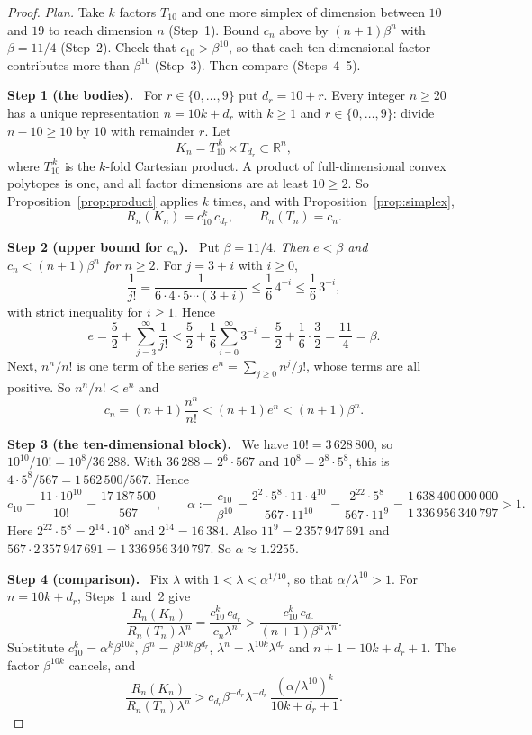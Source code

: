 \documentclass[11pt]{article}
\newcommand{\R}{\mathbb R}
\newcommand{\step}[1]{\par\smallskip\noindent\textbf{#1}\ }
\begin{document}
\begin{proof}
\emph{Plan.} Take \(k\) factors \(T_{10}\) and one more simplex of
dimension between \(10\) and \(19\) to reach dimension \(n\) (Step~1).
Bound \(c_n\) above by \((n+1)\beta^n\) with \(\beta=11/4\) (Step~2). Check
that \(c_{10}>\beta^{10}\), so that each ten-dimensional factor
contributes more than \(\beta^{10}\) (Step~3). Then compare (Steps~4--5).

\step{Step 1 (the bodies).} For \(r\in\{0,\ldots,9\}\) put \(d_r=10+r\).
Every integer \(n\ge20\) has a unique representation \(n=10k+d_r\) with
\(k\ge1\) and \(r\in\{0,\dots,9\}\): divide \(n-10\ge10\) by \(10\) with
remainder \(r\). Let
\[
 K_n=T_{10}^{\,k}\times T_{d_r}\subset\R^n,
\]
where \(T_{10}^{\,k}\) is the \(k\)-fold Cartesian product. A product of
full-dimensional convex polytopes is one, and all factor dimensions are at
least \(10\ge2\). So Proposition~\ref{prop:product} applies \(k\) times,
and with Proposition~\ref{prop:simplex},
\[
 R_n(K_n)=c_{10}^k\,c_{d_r},\qquad R_n(T_n)=c_n.
\]

\step{Step 2 (upper bound for \(c_n\)).} Put \(\beta=11/4\). \emph{Then
\(e<\beta\) and \(c_n<(n+1)\beta^n\) for \(n\ge2\).} For \(j=3+i\) with
\(i\ge0\),
\[
 \frac1{j!}=\frac1{6\cdot4\cdot5\cdots(3+i)}\le\frac16\,4^{-i}
 \le\frac16\,3^{-i},
\]
with strict inequality for \(i\ge1\). Hence
\[
 e=\frac52+\sum_{j=3}^{\infty}\frac1{j!}
 <\frac52+\frac16\sum_{i=0}^{\infty}3^{-i}
 =\frac52+\frac16\cdot\frac32=\frac{11}4=\beta.
\]
Next, \(n^n/n!\) is one term of the series
\(e^n=\sum_{j\ge0}n^j/j!\), whose terms are all positive. So
\(n^n/n!<e^n\) and
\[
 c_n=(n+1)\frac{n^n}{n!}<(n+1)e^n<(n+1)\beta^n.
\]

\step{Step 3 (the ten-dimensional block).} We have \(10!=3\,628\,800\), so
\(10^{10}/10!=10^8/36\,288\). With \(36\,288=2^6\cdot567\) and
\(10^8=2^8\cdot5^8\), this is \(4\cdot5^8/567=1\,562\,500/567\). Hence
\[
 c_{10}=\frac{11\cdot10^{10}}{10!}=\frac{17\,187\,500}{567},
 \qquad
 \alpha:=\frac{c_{10}}{\beta^{10}}
 =\frac{2^2\cdot5^8\cdot11\cdot4^{10}}{567\cdot11^{10}}
 =\frac{2^{22}\cdot5^8}{567\cdot11^9}
 =\frac{1\,638\,400\,000\,000}{1\,336\,956\,340\,797}>1.
\]
Here \(2^{22}\cdot5^8=2^{14}\cdot10^8\) and \(2^{14}=16\,384\). Also
\(11^9=2\,357\,947\,691\) and
\(567\cdot2\,357\,947\,691=1\,336\,956\,340\,797\). So
\(\alpha\approx1.2255\).

\step{Step 4 (comparison).} Fix \(\lambda\) with
\(1<\lambda<\alpha^{1/10}\), so that \(\alpha/\lambda^{10}>1\). For
\(n=10k+d_r\), Steps~1 and~2 give
\[
 \frac{R_n(K_n)}{R_n(T_n)\lambda^n}
 =\frac{c_{10}^k\,c_{d_r}}{c_n\lambda^n}
 >\frac{c_{10}^k\,c_{d_r}}{(n+1)\beta^n\lambda^n}.
\]
Substitute \(c_{10}^k=\alpha^k\beta^{10k}\),
\(\beta^n=\beta^{10k}\beta^{d_r}\),
\(\lambda^n=\lambda^{10k}\lambda^{d_r}\) and \(n+1=10k+d_r+1\). The factor
\(\beta^{10k}\) cancels, and
\[
 \frac{R_n(K_n)}{R_n(T_n)\lambda^n}
 >c_{d_r}\beta^{-d_r}\lambda^{-d_r}\,
   \frac{(\alpha/\lambda^{10})^k}{10k+d_r+1}.
\]


\end{proof}
\end{document}
